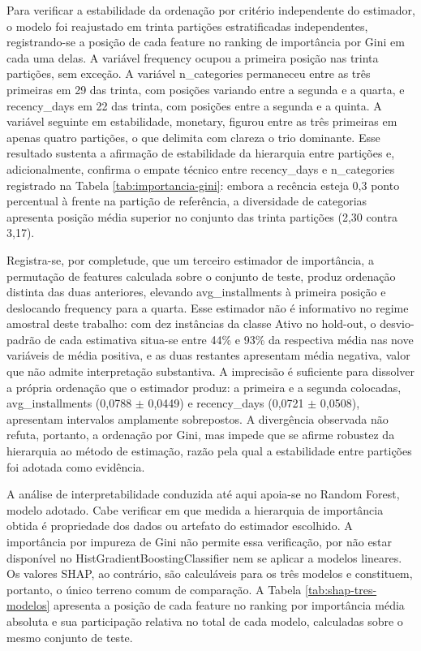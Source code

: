 Para verificar a estabilidade da ordenação por critério independente do estimador, o modelo foi reajustado em trinta partições estratificadas independentes, registrando-se a posição de cada feature no ranking de importância por Gini em cada uma delas. A variável frequency ocupou a primeira posição nas trinta partições, sem exceção. A variável n\_categories permaneceu entre as três primeiras em 29 das trinta, com posições variando entre a segunda e a quarta, e recency\_days em 22 das trinta, com posições entre a segunda e a quinta. A variável seguinte em estabilidade, monetary, figurou entre as três primeiras em apenas quatro partições, o que delimita com clareza o trio dominante. Esse resultado sustenta a afirmação de estabilidade da hierarquia entre partições e, adicionalmente, confirma o empate técnico entre recency\_days e n\_categories registrado na Tabela \ref{tab:importancia-gini}: embora a recência esteja 0,3 ponto percentual à frente na partição de referência, a diversidade de categorias apresenta posição média superior no conjunto das trinta partições (2,30 contra 3,17).

Registra-se, por completude, que um terceiro estimador de importância, a permutação de features calculada sobre o conjunto de teste, produz ordenação distinta das duas anteriores, elevando avg\_installments à primeira posição e deslocando frequency para a quarta. Esse estimador não é informativo no regime amostral deste trabalho: com dez instâncias da classe Ativo no hold-out, o desvio-padrão de cada estimativa situa-se entre 44\% e 93\% da respectiva média nas nove variáveis de média positiva, e as duas restantes apresentam média negativa, valor que não admite interpretação substantiva. A imprecisão é suficiente para dissolver a própria ordenação que o estimador produz: a primeira e a segunda colocadas, avg\_installments (0,0788 $\pm$ 0,0449) e recency\_days (0,0721 $\pm$ 0,0508), apresentam intervalos amplamente sobrepostos. A divergência observada não refuta, portanto, a ordenação por Gini, mas impede que se afirme robustez da hierarquia ao método de estimação, razão pela qual a estabilidade entre partições foi adotada como evidência.

A análise de interpretabilidade conduzida até aqui apoia-se no Random Forest, modelo adotado. Cabe verificar em que medida a hierarquia de importância obtida é propriedade dos dados ou artefato do estimador escolhido. A importância por impureza de Gini não permite essa verificação, por não estar disponível no HistGradientBoostingClassifier nem se aplicar a modelos lineares. Os valores SHAP, ao contrário, são calculáveis para os três modelos e constituem, portanto, o único terreno comum de comparação. A Tabela \ref{tab:shap-tres-modelos} apresenta a posição de cada feature no ranking por importância média absoluta e sua participação relativa no total de cada modelo, calculadas sobre o mesmo conjunto de teste.

